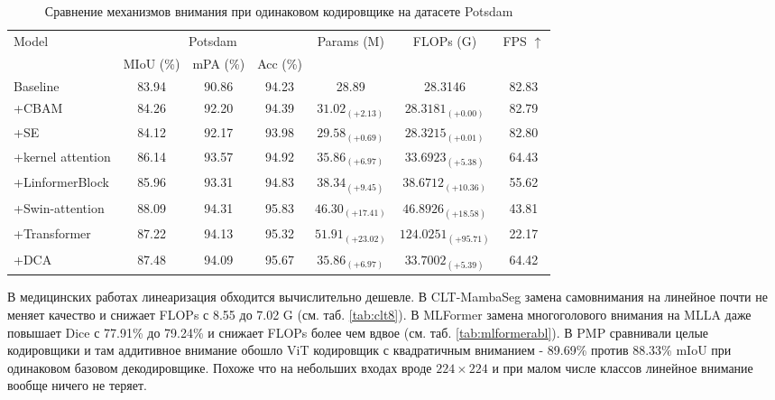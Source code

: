 \documentclass[areasetadvanced]{scrartcl}
\begin{document}
		\begin{table}[H]
			\centering
			\footnotesize
			\caption{Сравнение механизмов внимания при одинаковом кодировщике на датасете Potsdam \cite{abcfnet}}
			\label{tab:abcfattn}
			\setlength{\tabcolsep}{4pt}
			\begin{adjustbox}{max width=\linewidth}
			\begin{tabular}{lcccccc}
				\toprule
				\multirow{2}{*}{Model} & \multicolumn{3}{c}{Potsdam} & \multirow{2}{*}{Params (M)} & \multirow{2}{*}{FLOPs (G)} & \multirow{2}{*}{FPS $\uparrow$} \\
				\cmidrule(lr){2-4}
				 & MIoU (\%) & mPA (\%) & Acc (\%) & & & \\
				\midrule
				Baseline & 83.94 & 90.86 & 94.23 & 28.89 & 28.3146 & 82.83 \\
				+CBAM & 84.26 & 92.20 & 94.39 & $31.02_{(+2.13)}$ & $28.3181_{(+0.00)}$ & 82.79 \\
				+SE & 84.12 & 92.17 & 93.98 & $29.58_{(+0.69)}$ & $28.3215_{(+0.01)}$ & 82.80 \\
				+kernel attention & 86.14 & 93.57 & 94.92 & $35.86_{(+6.97)}$ & $33.6923_{(+5.38)}$ & 64.43 \\
				+LinformerBlock & 85.96 & 93.31 & 94.83 & $38.34_{(+9.45)}$ & $38.6712_{(+10.36)}$ & 55.62 \\
				+Swin-attention & 88.09 & 94.31 & 95.83 & $46.30_{(+17.41)}$ & $46.8926_{(+18.58)}$ & 43.81 \\
				+Transformer & 87.22 & 94.13 & 95.32 & $51.91_{(+23.02)}$ & $124.0251_{(+95.71)}$ & 22.17 \\
				+DCA & 87.48 & 94.09 & 95.67 & $35.86_{(+6.97)}$ & $33.7002_{(+5.39)}$ & 64.42 \\
				\bottomrule
			\end{tabular}
			\end{adjustbox}
		\end{table}

		В медицинских работах линеаризация обходится вычислительно дешевле. В CLT-MambaSeg замена самовнимания на линейное почти не меняет качество
		и снижает FLOPs с 8.55 до 7.02 G (см. таб. \ref{tab:clt8}). В MLFormer замена многоголового внимания на MLLA даже повышает Dice с
		77.91\% до 79.24\% и снижает FLOPs более чем вдвое (см. таб. \ref{tab:mlformerabl}). В PMP сравнивали целые кодировщики и там
		аддитивное внимание обошло ViT кодировщик с квадратичным вниманием - 89.69\% против 88.33\% mIoU при одинаковом базовом декодировщике. Похоже что
		на небольших входах вроде $224 \times 224$ и при малом числе классов линейное внимание вообще ничего не теряет.
\end{document}
